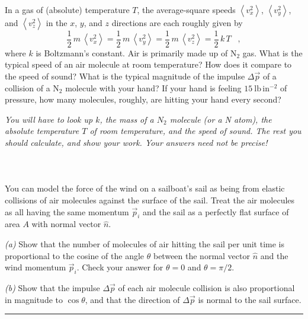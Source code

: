 \documentclass[12pt]{article}
\newcounter{problem}
\begin{document}
\paragraph{\problemname~\theproblem}

In a gas of (absolute) temperature $T$, the average-square speeds
$\left<v_x^2\right>$, $\left<v_y^2\right>$, and $\left<v_z^2\right>$
in the $x$, $y$, and $z$ directions are each roughly given by
\begin{equation}
\frac{1}{2}\,m\,\left<v_x^2\right> =
\frac{1}{2}\,m\,\left<v_y^2\right> =
\frac{1}{2}\,m\,\left<v_z^2\right> =
\frac{1}{2}\,k\,T \nonumber \;\;\; ,
\end{equation}
where $k$ is Boltzmann's constant.  Air is primarily made up of
$\mathrm{N_2}$ gas.  What is the typical speed of an air molecule at
room temperature?  How does it compare to the speed of sound?  What is
the typical magnitude of the impulse $\Delta\vec{p}$ of a collision of
a $\mathrm{N_2}$ molecule with your hand?  If your hand is feeling
$15~\mathrm{lb\,in^{-2}}$ of pressure, how many molecules, roughly,
are hitting your hand every second?

\textit{You will have to look up $k$, the mass of a $N_2$ molecule (or
a N atom), the absolute temperature $T$ of room temperature, and the
speed of sound.  The rest you should calculate, and show your work.
Your answers need not be precise!}

\paragraph{\problemname~\theproblem}

You can model the force of the wind on a sailboat's sail as being from
elastic collisions of air molecules against the surface of the sail.
Treat the air molecules as all having the same momentum $\vec{p}_i$
and the sail as a perfectly flat surface of area $A$ with normal
vector $\hat{n}$.

\textsl{(a)} Show that the number of molecules of air hitting the sail
per unit time is proportional to the cosine of the angle $\theta$
between the normal vector $\hat{n}$ and the wind momentum $\vec{p}_i$.
Check your answer for $\theta=0$ and $\theta=\pi/2$.

\textsl{(b)} Show that the impulse $\Delta\vec{p}$ of each air
molecule collision is also proportional in magnitude to $\cos\theta$,
and that the direction of $\Delta\vec{p}$ is normal to the sail
surface.
\\ \rule{0.3\textwidth}{0pt}
\end{document}
